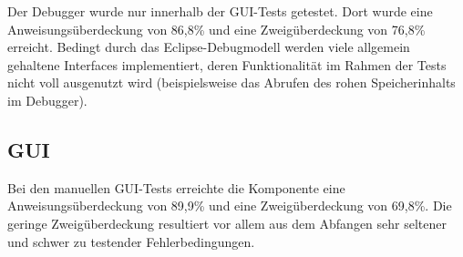 Der Debugger wurde nur innerhalb der GUI-Tests getestet. Dort wurde eine Anweisungsüberdeckung von 86,8\% und eine Zweigüberdeckung von 76,8\% erreicht. Bedingt durch das Eclipse-Debugmodell werden viele allgemein gehaltene Interfaces implementiert, deren Funktionalität im Rahmen der Tests nicht voll ausgenutzt wird (beispielsweise das Abrufen des rohen Speicherinhalts im Debugger).

\subsection{GUI}

Bei den manuellen GUI-Tests erreichte die Komponente eine Anweisungsüberdeckung von 89,9\% und eine Zweigüberdeckung von 69,8\%. Die geringe Zweigüberdeckung resultiert vor allem aus dem Abfangen sehr seltener und schwer zu testender Fehlerbedingungen.